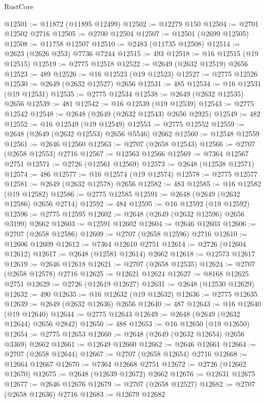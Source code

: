 \begin{lexlean}{RustCore}
\begin{coremodule}
@12501 := @11872 (@11895 @12499)
@12502 := @12279 @150
@12504 := @2701 @12502 @2716
@12505 := @2700 @12504
@12507 := @12501 (@2699 @12505)
@12508 := @11758 @12507
@12510 := @2483 (@11735 @12508)
@12514 := @2623 (@2626 @253) @7736 @7244
@12515 := 493
@12518 := @16 @12515 (@19 @12515)
@12519 := @2775 @12518
@12522 := @2649 (@2632 @12519) @2656
@12523 := 489
@12526 := @16 @12523 (@19 @12523)
@12527 := @2775 @12526
@12530 := @2649 (@2632 @12527) @2656
@12531 := 485
@12534 := @16 @12531 (@19 @12531)
@12535 := @2775 @12534
@12538 := @2649 (@2632 @12535) @2656
@12539 := 481
@12542 := @16 @12539 (@19 @12539)
@12543 := @2775 @12542
@12548 := @2648 (@2649 (@2632 @12543) @2656 @2925)
@12549 := 482
@12552 := @16 @12549 (@19 @12549)
@12553 := @2775 @12552
@12559 := @2648 (@2649 (@2632 @12553) @2656 @5546) @2662
@12560 := @12548 @12559
@12561 := @2646 @12560
@12563 := @2707 (@2658 @12543)
@12566 := @2707 (@2658 @12553) @2716
@12567 := @12563 @12566
@12569 := @7364 @12567 @2751
@12571 := @2726 (@12561 @12569)
@12573 := @2648 (@12538 @12571)
@12574 := 486
@12577 := @16 @12574 (@19 @12574)
@12578 := @2775 @12577
@12581 := @2649 (@2632 @12578) @2656
@12582 := 483
@12585 := @16 @12582 (@19 @12582)
@12586 := @2775 @12585
@12591 := @2648 (@2649 (@2632 @12586) @2656 @2714)
@12592 := 484
@12595 := @16 @12592 (@19 @12592)
@12596 := @2775 @12595
@12602 := @2648 (@2649 (@2632 @12596) @2656 @3199) @2662
@12603 := @12591 @12602
@12604 := @2646 @12603
@12606 := @2707 (@2658 @12586)
@12609 := @2707 (@2658 @12596) @2716
@12610 := @12606 @12609
@12612 := @7364 @12610 @2751
@12614 := @2726 (@12604 @12612)
@12617 := @2648 (@12581 @12614) @2662
@12618 := @12573 @12617
@12619 := @2646 @12618
@12621 := @2707 (@2658 @12535)
@12624 := @2707 (@2658 @12578) @2716
@12625 := @12621 @12624
@12627 := @8168 @12625 @2751
@12629 := @2726 (@12619 @12627)
@12631 := @2648 (@12530 @12629)
@12632 := 490
@12635 := @16 @12632 (@19 @12632)
@12636 := @2775 @12635
@12639 := @2649 (@2632 @12636) @2656
@12640 := 487
@12643 := @16 @12640 (@19 @12640)
@12644 := @2775 @12643
@12649 := @2648 (@2649 (@2632 @12644) @2656 @2842)
@12650 := 488
@12653 := @16 @12650 (@19 @12650)
@12654 := @2775 @12653
@12660 := @2648 (@2649 (@2632 @12654) @2656 @3369) @2662
@12661 := @12649 @12660
@12662 := @2646 @12661
@12664 := @2707 (@2658 @12644)
@12667 := @2707 (@2658 @12654) @2716
@12668 := @12664 @12667
@12670 := @7364 @12668 @2751
@12672 := @2726 (@12662 @12670)
@12675 := @2648 (@12639 @12672) @2662
@12676 := @12631 @12675
@12677 := @2646 @12676
@12679 := @2707 (@2658 @12527)
@12682 := @2707 (@2658 @12636) @2716
@12683 := @12679 @12682

\end{coremodule}
\end{lexlean}
